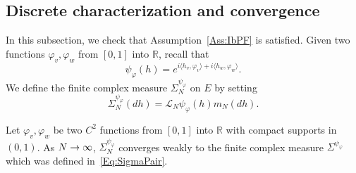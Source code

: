\documentclass[10pt]{amsart}
\theoremstyle{definition}\newtheorem{defi}[theo]{Definition}\newtheorem{rema}[theo]{Remark}\newtheorem{exam}[theo]{Example}\newtheorem{exem}[theo]{Example}\newtheorem{nota}[theo]{Notation}
\theoremstyle{plain}
\newcommand{\cL}{\mathcal{L}}
\newcommand{\R}{\mathbb{R}}
\renewcommand*{\to}{\mathchoice{\longrightarrow}{\rightarrow}{\rightarrow}{\rightarrow}}
\begin{document}
\subsection{Discrete characterization and convergence}

In this subsection, we check that Assumption~\ref{Ass:IbPF} is satisfied. Given two functions $\varphi_v,\varphi_w$ from $[0,1]$ into $\R$, recall that
\[
\psi_\varphi(h)= e^{i \langle h_v,\varphi_v\rangle+i\langle h_w,\varphi_w\rangle}.
\]
We define the finite complex measure $ \Sigma^{\psi_\varphi}_N$ on $E$ by setting
\begin{equation}
\Sigma^{\psi_\varphi}_N(dh) =\cL_N \psi_\varphi(h)m_N(dh).
\end{equation}

\begin{prop}\label{Prop:DiscreteIbPFPair}
Let $\varphi_v,\varphi_w$ be two $C^2$ functions from $[0,1]$ into $\R$ with compact supports in $(0,1)$. As $N\to\infty$, $ \Sigma^{\psi_\varphi}_N$ converges weakly to the finite complex measure $\Sigma^{\psi_\varphi}$ which was defined in~\eqref{Eq:SigmaPair}.
\end{prop}
\end{document}
